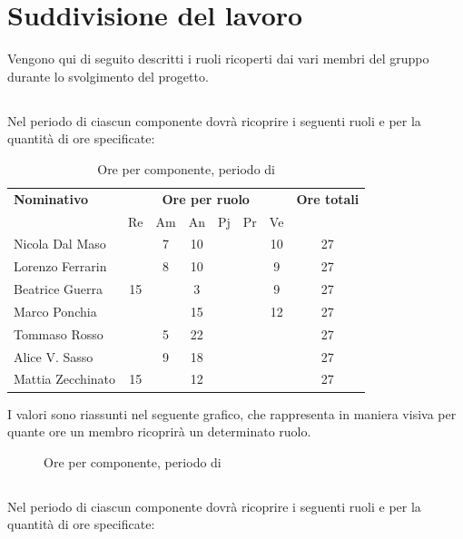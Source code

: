 \section{Suddivisione del lavoro}
Vengono qui di seguito descritti i ruoli ricoperti dai vari membri del gruppo durante lo svolgimento del progetto.
\subsection{\AR}
Nel periodo di \AR{} ciascun componente dovrà ricoprire i seguenti ruoli e per la quantità di ore specificate:

\begin{table}[H]
	\centering
	\begin{tabular}{|l|c|c|c|c|c|c|c|}
		\hline
		\textbf{Nominativo} & 
		\multicolumn{6}{c|}{\textbf{Ore per ruolo}} & 
		\textbf{Ore totali} \\
		& Re & Am & An & Pj & Pr & Ve & \\
		\hline
		Nicola Dal Maso & & 7 & 10 & & & 10 & 27 \\
		Lorenzo Ferrarin & & 8 & 10 & & & 9 & 27 \\
		Beatrice Guerra & 15 & & 3 & & & 9 & 27 \\
		Marco Ponchia & & & 15 & & & 12 & 27 \\
		Tommaso Rosso & & 5 & 22 & & & & 27 \\
		Alice V. Sasso & & 9 & 18 & & & & 27 \\
		Mattia Zecchinato & 15 & & 12 & & & & 27 \\
		\hline
	\end{tabular}
	\caption{Ore per componente, periodo di \AR{}}
\end{table}
I valori sono riassunti nel seguente grafico, che rappresenta in maniera visiva per quante ore un membro ricoprirà un determinato ruolo.
\begin{figure}[H]
	\centering
	\caption{Ore per componente, periodo di \AR{}}
\end{figure}


\subsection{\AD}
Nel periodo di \AD{} ciascun componente dovrà ricoprire i seguenti ruoli e per la quantità di ore specificate:

